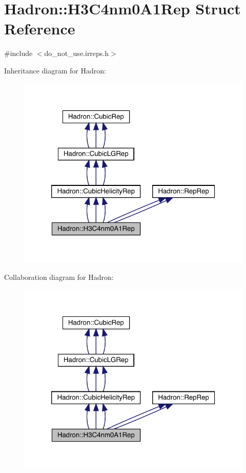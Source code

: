 \hypertarget{structHadron_1_1H3C4nm0A1Rep}{}\section{Hadron\+:\+:H3\+C4nm0\+A1\+Rep Struct Reference}
\label{structHadron_1_1H3C4nm0A1Rep}


{\ttfamily \#include $<$do\+\_\+not\+\_\+use.\+irreps.\+h$>$}



Inheritance diagram for Hadron\+:
\nopagebreak
\begin{figure}[H]
\begin{center}
\leavevmode
\includegraphics[width=320pt]{d6/d30/structHadron_1_1H3C4nm0A1Rep__inherit__graph}
\end{center}
\end{figure}


Collaboration diagram for Hadron\+:
\nopagebreak
\begin{figure}[H]
\begin{center}
\leavevmode
\includegraphics[width=320pt]{d4/d9b/structHadron_1_1H3C4nm0A1Rep__coll__graph}
\end{center}
\end{figure}
